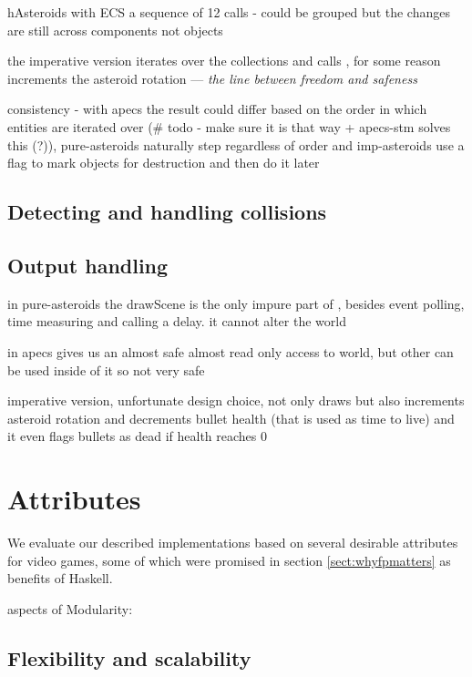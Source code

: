 \documentclass[
  digital, %
  color,   %
  table,   %
  oneside, %
  lof,     %
  lot,     %
]{fithesis3}
\begin{document}
{hAsteroids with ECS a sequence of 12 calls - could be grouped but the
changes are still across components not objects

the imperative version iterates over the collections and calls ,
for some reason  increments the asteroid rotation
--- \emph{the line between freedom and safeness}

consistency - with apecs the result could differ based on the order in which
entities are iterated over (\# todo - make sure it is that way + apecs-stm solves this (?)),
pure-asteroids naturally step regardless of order and imp-asteroids use a flag to mark
objects for destruction and then do it later

\subsection{Detecting and handling collisions}



\subsection{Output handling}

in pure-asteroids the drawScene is the only impure part of ,
besides event polling, time measuring and calling a delay. it cannot alter the world

in apecs  gives us an almost safe almost read only access to world,
but other  can be used inside of it so not very safe

imperative version, unfortunate design choice,  not only draws
but also increments asteroid rotation and decrements bullet health (that is used as time to live)
and it even flags bullets as dead if health reaches 0

\section{Attributes}
We evaluate our described implementations based on several desirable attributes for video games,
some of which were promised in section \ref{sect:whyfpmatters} as benefits of Haskell.

aspects of Modularity:
\subsection{Flexibility and scalability}


}
\end{document}
